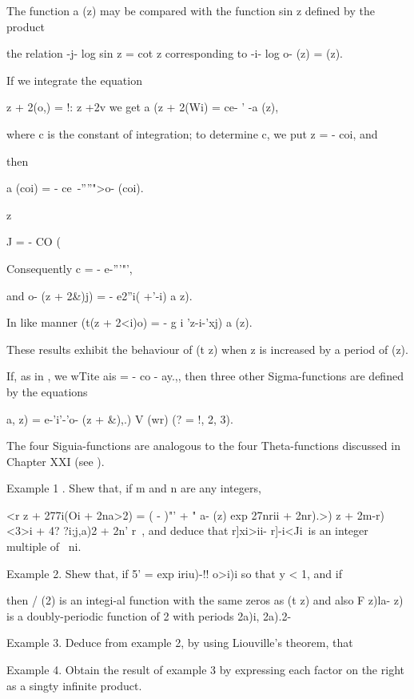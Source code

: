 {The function a (z) may be compared with the function sin z defined by
the product

the relation -j- log sin z = cot z corresponding to -i- log o- (z) =
(z).


If we integrate the equation

  z + 2(o,) = !: z +2v we get a (z + 2(Wi) = ce- ' -a (z),

where c is the constant of integration; to determine c, we put z = -
coi, and

then

a (coi) = - ce~-''''">o- (coi).

z

J = - CO (\

%
%

Consequently c = - e-'''"',

and o- (z + 2\&)j) = - e2''i( +'-i) a z).

In like manner (t(z + 2<i)o) = - g i 'z-i-'xj) a (z).

These results exhibit the behaviour of (t z) when z is increased by a
period of (z).

If, as in , we wTite ais = - co - ay.,, then three other
Sigma-functions are defined by the equations

a, z) = e-'i'-'o- (z + \&),.) V (wr) (? = !, 2, 3).

The four Siguia-functions are analogous to the four Theta-functions
discussed in Chapter XXI (see ).

Example 1 . Shew that, if m and n are any integers,

<r z + 277i(Oi + 2na>2) = ( - )"' + " a- (z) exp 27nrii + 2nr).>) z +
2m-r) <3>i + 4? ?i;j,a)2 + 2n' r\ < ia>, and deduce that r]xi>ii-
r]-i<Ji\ is an integer multiple of \ ni.

Example 2. Shew that, if 5' = exp iriu)-!! o>i)i so that y < 1, and if

then / (2) is an integi-al function with the same zeros as (t z) and
also F z)la- z) is a doubly-periodic function of 2 with periods 2a)i,
2a).2-

Example 3. Deduce from example 2, by using Liouville's theorem, that

Example 4. Obtain the result of example 3 by expressing each factor on
the right as a singty infinite product.


}

